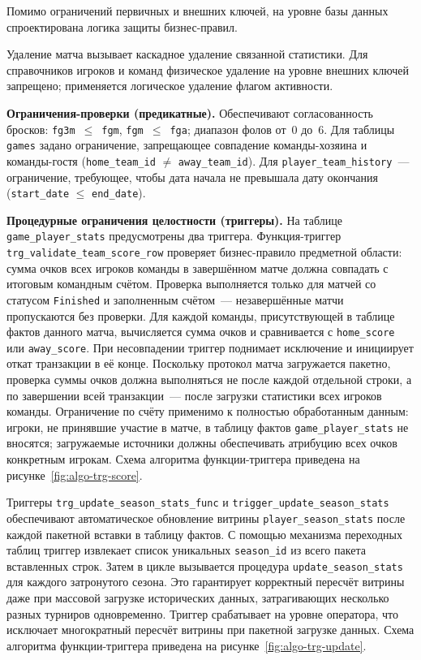 Помимо ограничений первичных и внешних ключей, на уровне базы данных
спроектирована логика защиты бизнес-правил.

Удаление матча вызывает каскадное удаление связанной статистики.
Для справочников игроков и команд физическое удаление на уровне внешних ключей
запрещено; применяется логическое удаление флагом активности.

\textbf{Ограничения-проверки (предикатные).}
Обеспечивают согласованность бросков: \newline \texttt{fg3m}~$\le$~\texttt{fgm},
\texttt{fgm}~$\le$~\texttt{fga}; диапазон фолов от~0 до~6.
Для таблицы \texttt{games} задано ограничение, запрещающее совпадение
команды-хозяина и команды-гостя (\texttt{home\_team\_id} $\neq$
\texttt{away\_team\_id}). Для \texttt{player\_team\_history}~--- ограничение,
требующее, чтобы дата начала не превышала дату окончания
(\texttt{start\_date} $\le$ \texttt{end\_date}).

\textbf{Процедурные ограничения целостности (триггеры).}
На таблице \texttt{game\_player\_stats} предусмотрены два триггера.
Функция-триггер \texttt{trg\_validate\_team\_score\_row} проверяет
бизнес-правило предметной области: сумма очков всех игроков команды
в завершённом матче должна совпадать с итоговым командным счётом.
Проверка выполняется только для матчей со статусом \texttt{Finished}
и заполненным счётом~--- незавершённые матчи пропускаются без проверки.
Для каждой команды, присутствующей в таблице фактов данного матча,
вычисляется сумма очков и сравнивается с \texttt{home\_score}
или \texttt{away\_score}. При несовпадении триггер поднимает исключение
и инициирует откат транзакции в её конце.
Поскольку протокол матча загружается пакетно, проверка суммы очков
должна выполняться не после каждой отдельной строки, а по завершении
всей транзакции~--- после загрузки статистики всех игроков команды.
Ограничение по счёту применимо к полностью обработанным данным:
игроки, не принявшие участие в матче, в таблицу фактов
\texttt{game\_player\_stats} не вносятся; загружаемые источники должны
обеспечивать атрибуцию всех очков конкретным игрокам.
Схема алгоритма функции-триггера приведена на рисунке~\ref{fig:algo-trg-score}.
\flowchartTriggerScore

Триггеры \texttt{trg\_update\_season\_stats\_func} и
\texttt{trigger\_update\_season\_stats} обеспечивают автоматическое
обновление витрины \texttt{player\_season\_stats} после каждой пакетной
вставки в таблицу фактов. С помощью механизма переходных таблиц триггер
извлекает список уникальных \texttt{season\_id} из всего пакета вставленных
строк. Затем в цикле вызывается процедура \texttt{update\_season\_stats}
для каждого затронутого сезона. Это гарантирует корректный пересчёт витрины
даже при массовой загрузке исторических данных, затрагивающих несколько
разных турниров одновременно. Триггер срабатывает на уровне оператора,
что исключает многократный пересчёт витрины при пакетной загрузке данных.
Схема алгоритма функции-триггера приведена на рисунке~\ref{fig:algo-trg-update}.
\flowchartTriggerSeasonStats

